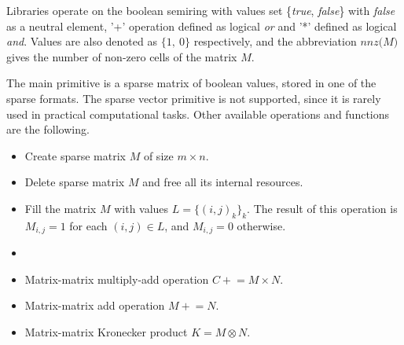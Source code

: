 Libraries operate on the boolean semiring with values set \{\textit{true}, \textit{false}\} with \textit{false} as
a neutral element, '+' operation defined as logical \textit{or} and '*' defined as logical \textit{and}.
Values are also denoted as $\{1,~0\}$ respectively, and the abbreviation $\textit{nnz(M)}$ gives the number of non-zero cells of the matrix $M$.

The main primitive is a sparse matrix of boolean values, stored in one of the sparse formats.
The sparse vector primitive is not supported, since it is rarely used in practical computational tasks.
Other available operations and functions are the following.

\begin{itemize}
    \item Create sparse matrix $M$ of size $m \times n$.
    \item Delete sparse matrix $M$ and free all its internal resources.
    \item Fill the matrix $M$ with values $L = \{(i,j)_k\}_k$. The result of this operation is $M_{i,j} = 1$ for each $(i, j) \in L$, and $M_{i,j} = 0$ otherwise.
    \item {}
    \item Matrix-matrix multiply-add operation $C \mathrel{+}= M \times N$.
    \item Matrix-matrix add operation $M \mathrel{+}= N$.
    \item Matrix-matrix Kronecker product $K = M \otimes N$.
\end{itemize}